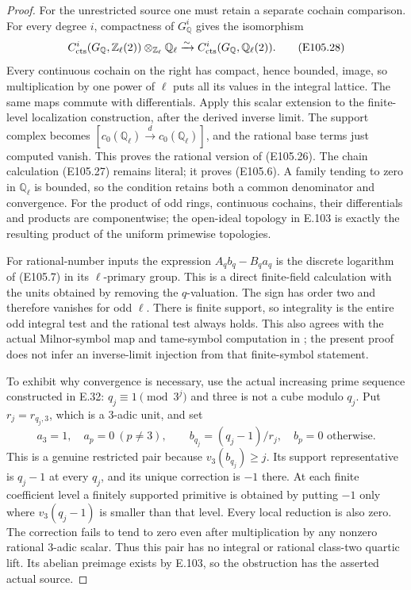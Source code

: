 \begin{proof}
For the unrestricted source one must retain a separate
cochain comparison.  For every degree $i$, compactness
of $G_{\mathbb Q}^i$ gives the isomorphism
\[
 C^i_{\rm cts}(G_{\mathbb Q},\mathbb Z_\ell(2))
           \otimes_{\mathbb Z_\ell}\mathbb Q_\ell
       \xrightarrow{\sim}
 C^i_{\rm cts}(G_{\mathbb Q},\mathbb Q_\ell(2)).
 \tag{E105.28}
\]
Every continuous cochain on the right has compact,
hence bounded, image, so multiplication by one power
of $\ell$ puts all its values in the integral lattice.
The same maps commute with differentials.
Apply this scalar extension to the finite-level
localization construction, after the derived inverse
limit.  The support complex becomes
$[c_0(\mathbb Q_\ell)\xrightarrow{d}c_0(\mathbb Q_\ell)]$,
and the rational base terms just computed vanish.
This proves the rational version of (E105.26).
The chain calculation (E105.27) remains literal;
it proves (E105.6).  A family tending to zero in
$\mathbb Q_\ell$ is bounded, so the condition retains
both a common denominator and convergence.  For the
product of odd rings, continuous cochains, their
differentials and products are componentwise; the
open-ideal topology in E.103 is exactly the resulting
product of the uniform primewise topologies.

For rational-number inputs the expression
$A_qb_q-B_qa_q$ is the discrete logarithm of (E105.7)
in its $\ell$-primary group.  This is a direct
finite-field calculation with the units obtained by
removing the $q$-valuation.  The sign has order two
and therefore vanishes for odd $\ell$.
There is finite support, so integrality is the entire
odd integral test and the rational test always holds.
This also agrees with the actual Milnor-symbol map
and tame-symbol computation in
\cite[Proposition26 and Remark28]{E_Wickelgren}; the
present proof does not infer an inverse-limit injection
from that finite-symbol statement.

To exhibit why convergence is necessary, use the
actual increasing prime sequence constructed in E.32:
$q_j\equiv1\pmod{3^j}$ and three is not a cube modulo
$q_j$.  Put $r_j=r_{q_j,3}$, which is a $3$-adic unit,
and set
\[
 a_3=1,\quad a_p=0\ (p\ne3),\qquad
 b_{q_j}=(q_j-1)/r_j,\quad b_p=0\text{ otherwise}.
 \tag{E105.29}
\]
This is a genuine restricted pair because
$v_3(b_{q_j})\ge j$.
Its support representative is $q_j-1$ at every $q_j$,
and its unique correction is $-1$ there.
At each finite coefficient level a finitely supported
primitive is obtained by putting $-1$ only where
$v_3(q_j-1)$ is smaller than that level.
Every local reduction is also zero.  The correction
fails to tend to zero even after multiplication by
any nonzero rational $3$-adic scalar.
Thus this pair has no integral or rational class-two
quartic lift.  Its abelian preimage exists by E.103,
so the obstruction has the asserted actual source.


\end{proof}
